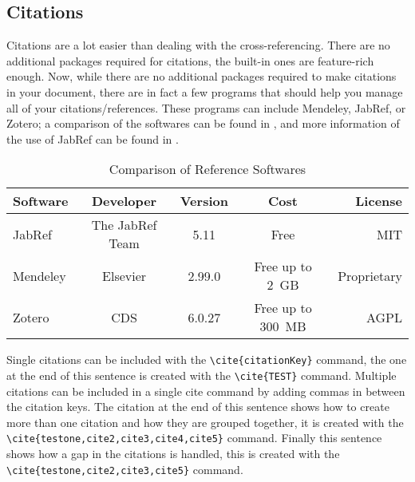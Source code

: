 		\subsection{Citations}\label{subsec:citations}
			Citations are a lot easier than dealing with the cross-referencing.
			There are no additional packages required for citations, the built-in ones are feature-rich enough.
			Now, while there are no additional packages required to make citations in your document, there are in fact a few programs that should help you manage all of your citations/references.
			These programs can include Mendeley, JabRef, or Zotero; a comparison of the softwares can be found in , and more information of the use of JabRef can be found in .
			\begin{table}[htbp]
				\centering
				\caption{Comparison of Reference Softwares}
				\label{tab:refSoftware}%
				\begin{tabularx}{0.9\textwidth}{Lcccr}
					\toprule
						Software & Developer         & Version & Cost                    & License \\
					\midrule
						JabRef   & The JabRef Team   & 5.11     & Free                    & MIT \\
						Mendeley & Elsevier          & 2.99.0   & {Free up to 2~GB}    & Proprietary \\
						Zotero   & CDS               & 6.0.27   & {Free  up to 300~MB} & AGPL  \\
					\bottomrule
				\end{tabularx}%
			\end{table}%
			Single citations can be included with the \lstinline|\cite{citationKey}| command, the one at the end of this sentence is created with the \lstinline|\cite{TEST}| command\cite{TEST}. 
			Multiple citations can be included in a single cite command by adding commas in between the citation keys. 
			The citation at the end of this sentence shows how to create more than one citation and how they are grouped together, it is created with the \lstinline|\cite{testone,cite2,cite3,cite4,cite5}| command\cite{testone,cite2,cite3,cite4,cite5}.
			Finally this sentence shows how a gap in the citations is handled, this is created with the \lstinline|\cite{testone,cite2,cite3,cite5}| command\cite{testone,cite2,cite3,cite5}. 